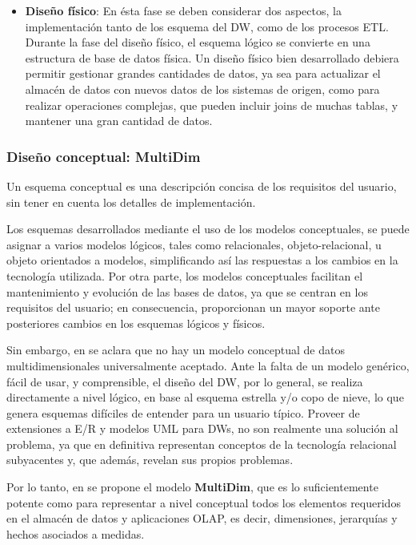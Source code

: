 \documentclass[a4paper,11pt]{article}
\begin{document}
\begin{itemize}
      \item \textbf{Diseño físico}:
      En ésta fase se deben considerar dos aspectos, la implementación tanto de los esquema del DW, como de los procesos ETL.
      Durante la fase del diseño físico, el esquema lógico se convierte en una estructura de base de datos física.
      Un diseño físico bien desarrollado debiera permitir gestionar grandes cantidades de datos, ya sea para actualizar el almacén de datos con nuevos datos de los
      sistemas de origen, como para realizar operaciones complejas, que pueden incluir joins de muchas tablas, y mantener una gran cantidad de datos.
      \end{itemize}      
      
      \subsubsection{Diseño conceptual: MultiDim}
      
      Un esquema conceptual es una descripción concisa de los requisitos del usuario, sin tener en cuenta los detalles de implementación.
      
      Los esquemas desarrollados mediante el uso de los modelos conceptuales, se puede asignar a varios modelos lógicos, tales como relacionales, objeto-relacional,
      u objeto orientados a modelos, simplificando así las respuestas a los cambios en la tecnología utilizada.
      Por otra parte, los modelos conceptuales facilitan el mantenimiento y evolución de las bases de datos, ya que se centran en los requisitos del usuario;
      en consecuencia, proporcionan un mayor soporte ante posteriores cambios en los esquemas lógicos y físicos.
      
      Sin embargo, en \cite{VaismanZimanyi14} se aclara que no hay un modelo conceptual de datos multidimensionales universalmente aceptado.
      Ante la falta de un modelo genérico, fácil de usar, y comprensible, el diseño del DW, por lo general, se realiza directamente a nivel lógico, en base
      al esquema estrella y/o copo de nieve, lo que genera esquemas difíciles de entender para un usuario típico.
      Proveer de extensiones a E/R y modelos UML para DWs, no son realmente una solución al problema, ya que en definitiva representan
      conceptos de la tecnología relacional subyacentes y, que además, revelan sus propios problemas.
      
      Por lo tanto, en \cite{VaismanZimanyi14} se propone el modelo \textbf{MultiDim}, que es lo suficientemente potente como para representar a nivel conceptual
      todos los elementos requeridos en el almacén de datos y aplicaciones OLAP, es decir, dimensiones, jerarquías y hechos asociados a medidas.
      
\end{document}
